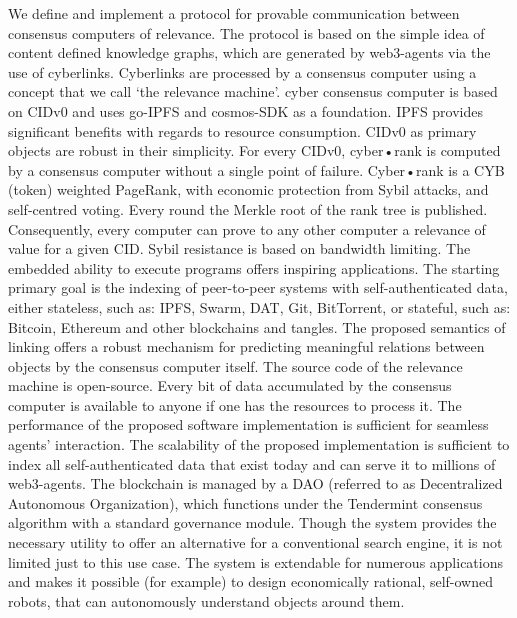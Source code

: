 \documentclass[8pt,oneside]{amsart}
\newcommand{\code}[1]{{\PlayBold #1}}
\begin{document}
\begin{Abstract}
We define and implement a protocol for provable communication between consensus computers of relevance.
The protocol is based on the simple idea of content defined knowledge graphs, which are generated by web3-agents via the use of cyberlinks.
Cyberlinks are processed by a consensus computer using a concept that we call ‘the relevance machine’.
\code{cyber} consensus computer is based on \code{CIDv0} and uses \code{go-IPFS} and \code{cosmos-SDK} as a foundation. IPFS provides significant benefits with regards to resource consumption. CIDv0 as primary objects are robust in their simplicity. For every CIDv0, cyber•rank is computed by a consensus computer without a single point of failure. Cyber•rank is a CYB (token) weighted PageRank, with economic protection from Sybil attacks, and self-centred voting. Every round the Merkle root of the rank tree is published. Consequently, every computer can prove to any other computer a relevance of value for a given CID. Sybil resistance is based on bandwidth limiting. The embedded ability to execute programs offers inspiring applications. The starting primary goal is the indexing of peer-to-peer systems with self-authenticated data, either stateless, such as: IPFS, Swarm, DAT, Git, BitTorrent, or stateful, such as: Bitcoin, Ethereum and other blockchains and tangles. The proposed semantics of linking offers a robust mechanism for predicting meaningful relations between objects by the consensus computer itself. The source code of the relevance machine is open-source. Every bit of data accumulated by the consensus computer is available to anyone if one has the resources to process it. The performance of the proposed software implementation is sufficient for seamless agents' interaction. The scalability of the proposed implementation is sufficient to index all self-authenticated data that exist today and can serve it to millions of web3-agents. The blockchain is managed by a DAO (referred to as Decentralized Autonomous Organization), which functions under the Tendermint consensus algorithm with a standard governance module. Though the system provides the necessary utility to offer an alternative for a conventional search engine, it is not limited just to this use case. The system is extendable for numerous applications and makes it possible (for example) to design economically rational, self-owned robots, that can autonomously understand objects around them.


\end{Abstract}
\end{document}
